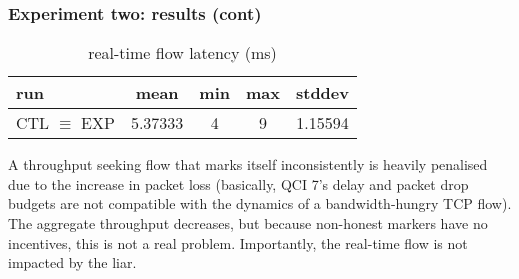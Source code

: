 \begin{frame}
\frametitle{Experiment two: results (cont)}

\begin{center}
  \begin{table}
    \begin{tabular}{l | c | c | c | c }
      run & mean & min & max & stddev \\
      \hline \hline
      CTL $\equiv$ EXP & 5.37333 & 4 & 9 & 1.15594\\
    \end{tabular}
    \caption{real-time flow latency (ms)}
  \end{table}
\end{center}

A throughput seeking flow that marks itself inconsistently is heavily penalised due to the increase in packet loss (basically, QCI 7's delay and packet drop budgets are not compatible with the dynamics of a bandwidth-hungry TCP flow). The aggregate throughput decreases, but because non-honest markers have no incentives, this is not a real problem.  Importantly, the real-time flow is not impacted by the liar.

\end{frame}
